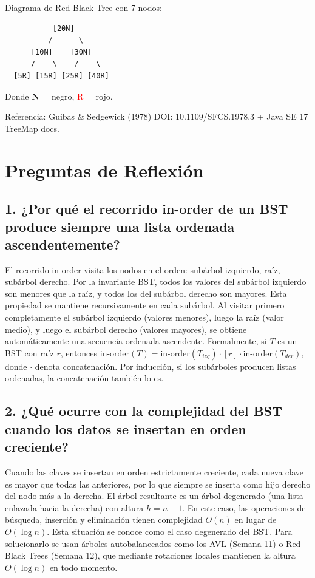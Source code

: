 \documentclass{article}
\begin{document}
Diagrama de Red-Black Tree con 7 nodos:

\begin{verbatim}
           [20N]
          /      \
      [10N]    [30N]
      /    \    /    \
  [5R] [15R] [25R] [40R]
\end{verbatim}
Donde \textbf{N} = negro, \textcolor{red}{R} = rojo.

Referencia: Guibas \& Sedgewick (1978) DOI: 10.1109/SFCS.1978.3 + Java SE 17 TreeMap docs.

\section{Preguntas de Reflexión}

\subsection*{1. ¿Por qué el recorrido in-order de un BST produce siempre una lista ordenada ascendentemente?}
El recorrido in-order visita los nodos en el orden: subárbol izquierdo, raíz, subárbol derecho. Por la invariante BST, todos los valores del subárbol izquierdo son menores que la raíz, y todos los del subárbol derecho son mayores. Esta propiedad se mantiene recursivamente en cada subárbol. Al visitar primero completamente el subárbol izquierdo (valores menores), luego la raíz (valor medio), y luego el subárbol derecho (valores mayores), se obtiene automáticamente una secuencia ordenada ascendente. Formalmente, si $T$ es un BST con raíz $r$, entonces $\text{in-order}(T) = \text{in-order}(T_{izq}) \cdot [r] \cdot \text{in-order}(T_{der})$, donde $\cdot$ denota concatenación. Por inducción, si los subárboles producen listas ordenadas, la concatenación también lo es.

\subsection*{2. ¿Qué ocurre con la complejidad del BST cuando los datos se insertan en orden creciente?}
Cuando las claves se insertan en orden estrictamente creciente, cada nueva clave es mayor que todas las anteriores, por lo que siempre se inserta como hijo derecho del nodo más a la derecha. El árbol resultante es un árbol degenerado (una lista enlazada hacia la derecha) con altura $h = n - 1$. En este caso, las operaciones de búsqueda, inserción y eliminación tienen complejidad $O(n)$ en lugar de $O(\log n)$. Esta situación se conoce como el caso degenerado del BST. Para solucionarlo se usan árboles autobalanceados como los AVL (Semana 11) o Red-Black Trees (Semana 12), que mediante rotaciones locales mantienen la altura $O(\log n)$ en todo momento.
\end{document}
